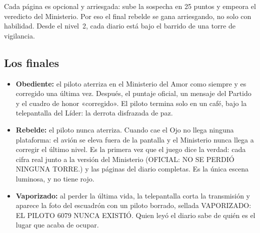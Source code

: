 \documentclass[11pt,a4paper]{article}
\newcommand{\game}[1]{{\machine\large #1}}
\begin{document}
Cada página es opcional y arriesgada: sube la sospecha en 25 puntos y empeora el veredicto del Ministerio. Por eso el final rebelde se gana arriesgando, no solo con habilidad. Desde el nivel~2, cada diario está bajo el barrido de una torre de vigilancia.

\subsection{Los finales}

\begin{center}
\end{center}

\begin{itemize}
  \item \textbf{Obediente:} el piloto aterriza en el Ministerio del Amor como siempre y es corregido una última vez. Después, el puntaje oficial, un mensaje del Partido y el cuadro de honor «corregido». El piloto termina solo en un café, bajo la telepantalla del Líder: la derrota disfrazada de paz.
  \item \textbf{Rebelde:} el piloto nunca aterriza. Cuando cae el Ojo no llega ninguna plataforma: el avión se eleva fuera de la pantalla y el Ministerio nunca llega a corregir el último nivel. Es la primera vez que el juego dice la verdad: cada cifra real junto a la versión del Ministerio (\game{OFICIAL: NO SE PERDIÓ NINGUNA TORRE.}) y las páginas del diario completas. Es la única escena luminosa, y no tiene rojo.
  \item \textbf{Vaporizado:} al perder la última vida, la telepantalla corta la transmisión y aparece la foto del escuadrón con un piloto borrado, sellada \game{VAPORIZADO}: \game{EL PILOTO 6079 NUNCA EXISTIÓ.} Quien leyó el diario sabe de quién es el lugar que acaba de ocupar.
\end{itemize}
\end{document}
